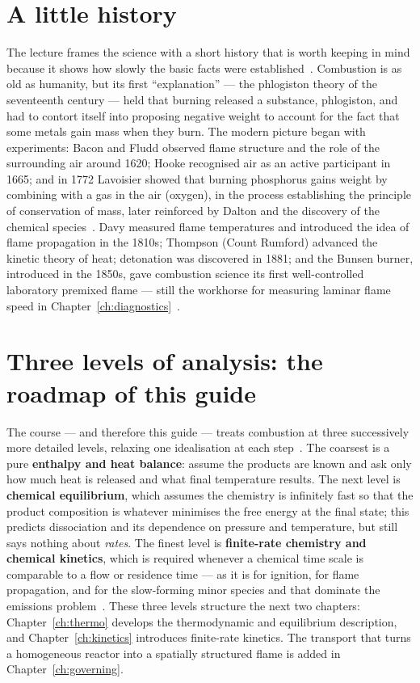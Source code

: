 \section{A little history}

The lecture frames the science with a short history that is worth keeping in mind because it shows how slowly the basic facts were established~\cite{lecture4}. Combustion is as old as humanity, but its first ``explanation'' --- the phlogiston theory of the seventeenth century --- held that burning released a substance, phlogiston, and had to contort itself into proposing negative weight to account for the fact that some metals gain mass when they burn. The modern picture began with experiments: Bacon and Fludd observed flame structure and the role of the surrounding air around 1620; Hooke recognised air as an active participant in 1665; and in 1772 Lavoisier showed that burning phosphorus gains weight by combining with a gas in the air (oxygen), in the process establishing the principle of conservation of mass, later reinforced by Dalton and the discovery of the chemical species~\cite{lecture4}. Davy measured flame temperatures and introduced the idea of flame propagation in the 1810s; Thompson (Count Rumford) advanced the kinetic theory of heat; detonation was discovered in 1881; and the Bunsen burner, introduced in the 1850s, gave combustion science its first well-controlled laboratory premixed flame --- still the workhorse for measuring laminar flame speed in Chapter~\ref{ch:diagnostics}~\cite{lecture4}.

\section{Three levels of analysis: the roadmap of this guide}

The course --- and therefore this guide --- treats combustion at three successively more detailed levels, relaxing one idealisation at each step~\cite{lecture1,lecture4}. The coarsest is a pure \textbf{enthalpy and heat balance}: assume the products are known and ask only how much heat is released and what final temperature results. The next level is \textbf{chemical equilibrium}, which assumes the chemistry is infinitely fast so that the product composition is whatever minimises the free energy at the final state; this predicts dissociation and its dependence on pressure and temperature, but still says nothing about \emph{rates}. The finest level is \textbf{finite-rate chemistry and chemical kinetics}, which is required whenever a chemical time scale is comparable to a flow or residence time --- as it is for ignition, for flame propagation, and for the slow-forming minor species  and  that dominate the emissions problem~\cite{lecture1,transcript_tutorial}. These three levels structure the next two chapters: Chapter~\ref{ch:thermo} develops the thermodynamic and equilibrium description, and Chapter~\ref{ch:kinetics} introduces finite-rate kinetics. The transport that turns a homogeneous reactor into a spatially structured flame is added in Chapter~\ref{ch:governing}.

